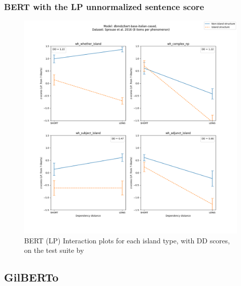 \subsubsection{BERT with the LP unnormalized sentence score}
\begin{figure}[h]
	\centering
	\includegraphics[width=1\textwidth]{images/Chapter1/Sprouse_wh_dbmdz_bert-base-italian-cased_LP-zscores-likert-2022-09-17_h11m04s37.png} 
	\caption{BERT (LP) Interaction plots for each island type, with DD scores, on the test suite by \citet{sprouse2016experimental}}
	\label{fig:sprouse_bert2b_lp} 
	\medskip
\end{figure}	


\clearpage
\subsection{GilBERTo}
